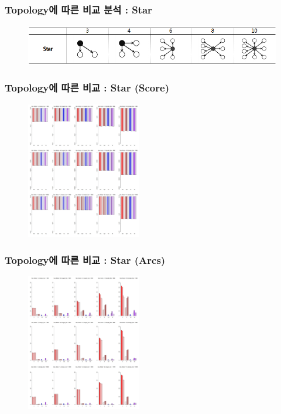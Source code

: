 \documentclass{beamer}
\begin{document}
\begin{frame}
\frametitle{Topology에 따른 비교 분석 : Star}
{\scriptsize{}
	\begin{figure}
		\includegraphics[height=50pt]{images/Topologies_Star}
	\end{figure}	
}
\end{frame}



\begin{frame}
\frametitle{Topology에 따른 비교 : Star (Score)}
{\scriptsize{}
	\begin{figure}
		\includegraphics[height=170pt]{images/03_Star_Score}
	\end{figure}	
}
\end{frame}


\begin{frame}
\frametitle{Topology에 따른 비교 : Star (Arcs)}
{\scriptsize{}
	\begin{figure}
		\includegraphics[height=170pt]{images/03_Star_Arcs}
	\end{figure}	
}
\end{frame}
\end{document}
